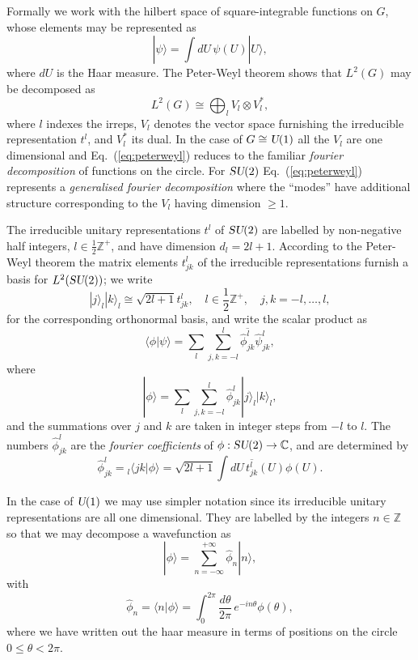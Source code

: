 \documentclass[twocolumn,lengthcheck,superscriptaddress]{revtex4-1}
\def\su2{\textsl{SU}(2)}
\def\uone{\textsl{U}(1)}
\theoremstyle{definition}
\theoremstyle{remark}
\begin{document}
Formally we work with the hilbert space of square-integrable functions on $G$, whose elements may be represented as
\begin{equation}
	|\psi\rangle = \int dU\, \psi(U)|U\rangle,
\end{equation}
where $dU$ is the Haar measure. The Peter-Weyl theorem shows that $L^2(G)$ may be decomposed as
\begin{equation}\label{eq:peterweyl}
	L^2(G) \cong \bigoplus_{l} V_l\otimes V_l^*,
\end{equation}
where $l$ indexes the irreps, $V_l$ denotes the vector space furnishing the irreducible representation $t^l$, and $V^*_l$ its dual. In the case of $G \cong \uone$ all the $V_l$ are one dimensional and Eq.~(\ref{eq:peterweyl}) reduces to the familiar \emph{fourier decomposition} of functions on the circle. For $\su2$ Eq.~(\ref{eq:peterweyl}) represents a \emph{generalised fourier decomposition} where the ``modes'' have additional structure corresponding to the $V_l$ having dimension $\ge 1$.

The irreducible unitary representations $t^l$ of $\su2$ are labelled by non-negative half integers, $l \in \frac12\mathbb{Z}^+$, and have dimension $d_l = 2l+1$.
According to the Peter-Weyl theorem the matrix elements $t^l_{jk}$ of the irreducible representations furnish a basis for $L^2(\su2)$; we write
\begin{equation}
	|j\rangle_l|k\rangle_l \cong \sqrt{2l+1} t_{jk}^l, \quad l \in \frac12\mathbb{Z}^+,\quad j,k = -l, \ldots, l,
\end{equation}
for the corresponding orthonormal basis, and write the scalar product as
\begin{equation}
	\langle \phi|\psi\rangle = \sum_{l}\sum_{j,k = -l}^l \overline{\widehat{\phi}_{jk}^l}\widehat{\psi}_{jk}^l,
\end{equation}
where 
\begin{equation}
	|\phi\rangle = \sum_{l}\sum_{j,k=-l}^l\widehat{\phi}_{jk}^l |j\rangle_l|k\rangle_l,
\end{equation}
and the summations over $j$ and $k$ are taken in integer steps from $-l$ to $l$. The numbers $\widehat{\phi}_{jk}^l$ are the \emph{fourier coefficients} of $\phi:\su2\rightarrow \mathbb{C}$, and are determined by
\begin{equation}
	\widehat{\phi}_{jk}^l = {_l\langle jk|\phi\rangle} = \sqrt{2l+1}\int dU \, \overline{t^l_{jk}}(U) \phi(U).
\end{equation}

In the case of $\uone$ we may use simpler notation since its irreducible unitary representations are
all one dimensional. They are labelled by the integers $n \in \mathbb{Z}$ so that we may decompose a wavefunction as
\begin{equation}
	|\phi\rangle = \sum_{n=-\infty}^{+\infty} \widehat{\phi}_n |n\rangle,
\end{equation}
with
\begin{equation}
	\widehat{\phi}_n = {\langle n|\phi\rangle} =  \int_0^{2\pi} \frac{d\theta}{2\pi} \, e^{-in\theta} \phi(\theta),
\end{equation}
where we have written out the haar measure in terms of positions on the circle
$0 \le \theta < 2\pi$.
\end{document}
